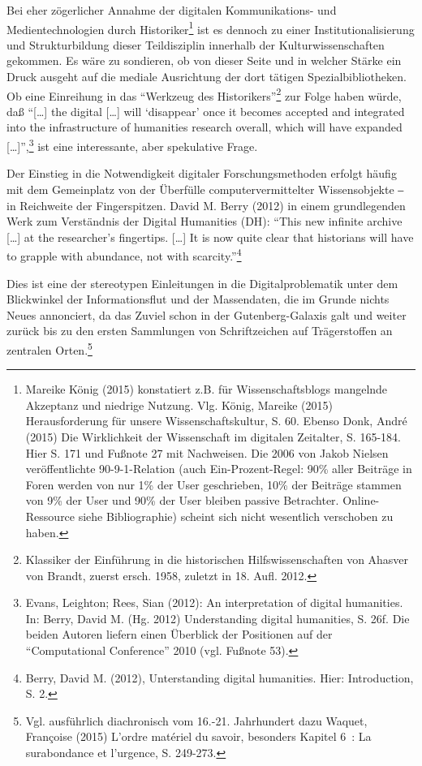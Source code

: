 \documentclass[a4paper,
fontsize=11pt,
oneside,
numbers=noperiodatend,
parskip=half-,
bibliography=totoc,
final
]{scrartcl}
\begin{document}
Bei eher zögerlicher Annahme der digitalen Kommunikations- und
Medientechnologien durch Historiker\footnote{Mareike König (2015)
  konstatiert z.B. für Wissenschaftsblogs mangelnde Akzeptanz und
  niedrige Nutzung. Vlg. König, Mareike (2015) Herausforderung für
  unsere Wissenschaftskultur, S. 60. Ebenso Donk, André (2015) Die
  Wirklichkeit der Wissenschaft im digitalen Zeitalter, S. 165-184. Hier
  S. 171 und Fußnote 27 mit Nachweisen. Die 2006 von Jakob Nielsen
  veröffentlichte 90-9-1-Relation (auch Ein-Prozent-Regel: 90\% aller
  Beiträge in Foren werden von nur 1\% der User geschrieben, 10\% der
  Beiträge stammen von 9\% der User und 90\% der User bleiben passive
  Betrachter. Online-Ressource siehe Bibliographie) scheint sich nicht
  wesentlich verschoben zu haben.} ist es dennoch zu einer
Institutionalisierung und Strukturbildung dieser Teildisziplin innerhalb
der Kulturwissenschaften gekommen. Es wäre zu sondieren, ob von dieser
Seite und in welcher Stärke ein Druck ausgeht auf die mediale
Ausrichtung der dort tätigen Spezialbibliotheken. Ob eine Einreihung in
das \enquote{Werkzeug des Historikers}\footnote{Klassiker der Einführung
  in die historischen Hilfswissenschaften von Ahasver von Brandt, zuerst
  ersch. 1958, zuletzt in 18. Aufl. 2012.} zur Folge haben würde, daß
\enquote{{[}\ldots{}{]} the digital {[}\ldots{}{]} will
\enquote{disappear} once it becomes accepted and integrated into the
infrastructure of humanities research overall, which will have expanded
{[}\ldots{}{]}},\footnote{Evans, Leighton; Rees, Sian (2012): An
  interpretation of digital humanities. In: Berry, David M. (Hg. 2012)
  Understanding digital humanities, S. 26f. Die beiden Autoren liefern
  einen Überblick der Positionen auf der \enquote{Computational
  Conference} 2010 (vgl. Fußnote 53).} ist eine interessante, aber
spekulative Frage.

Der Einstieg in die Notwendigkeit digitaler Forschungsmethoden erfolgt
häufig mit dem Gemeinplatz von der Überfülle computervermittelter
Wissensobjekte ‒ in Reichweite der Fingerspitzen. David M. Berry (2012)
in einem grundlegenden Werk zum Verständnis der Digital Humanities (DH):
\enquote{This new infinite archive {[}\ldots{}{]} at the researcher's
fingertips. {[}\ldots{}{]} It is now quite clear that historians will
have to grapple with abundance, not with scarcity.}\footnote{Berry,
  David M. (2012), Unterstanding digital humanities. Hier: Introduction,
  S. 2.}

Dies ist eine der stereotypen Einleitungen in die Digitalproblematik
unter dem Blickwinkel der Informationsflut und der Massendaten, die im
Grunde nichts Neues annonciert, da das Zuviel schon in der
Gutenberg-Galaxis galt und weiter zurück bis zu den ersten Sammlungen
von Schriftzeichen auf Trägerstoffen an zentralen Orten.\footnote{Vgl.
  ausführlich diachronisch vom 16.-21. Jahrhundert dazu Waquet,
  Françoise (2015) L'ordre matériel du savoir, besonders Kapitel 6~: La
  surabondance et l'urgence, S. 249-273.}
\end{document}
